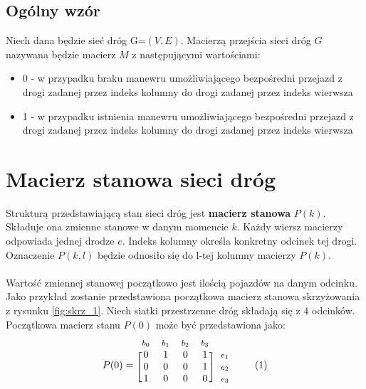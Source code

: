 \documentclass[12pt]{book}
\theoremstyle{plain}
\newcommand\addtag{\refstepcounter{equation}
\renewcommand{\labelenumii}{\theenumii}
\renewcommand{\theenumii}{\theenumi.\arabic{enumii}.}
\tag{\theequation}}
\begin{document}
\subsection{Ogólny wzór}
\begin{tcolorbox}
Niech dana będzie sieć dróg G=$(V,E)$. Macierzą przejścia sieci dróg $G$ nazywana będzie macierz $M$ z następującymi wartościami:
\begin{itemize}
\item 0 - w przypadku braku manewru umożliwiającego bezpośredni przejazd z drogi zadanej przez indeks kolumny do drogi zadanej przez indeks wierwsza
\item 1 - w przypadku istnienia manewru umożliwiającego bezpośredni przejazd z drogi zadanej przez indeks kolumny do drogi zadanej przez indeks wierwsza
\end{itemize}

\end{tcolorbox}





\section{Macierz stanowa sieci dróg}
Strukturą przedstawiającą stan sieci dróg jest \textbf{macierz stanowa} $P(k)$. Składuje ona zmienne stanowe w danym momencie $k$. Każdy wiersz macierzy odpowiada jednej drodze $e$. Indeks kolumny określa konkretny odcinek tej drogi. Oznaczenie $P(k,l)$ będzie odnosiło się do l-tej kolumny macierzy $P(k)$. \\ \\ Wartość zmiennej stanowej początkowo jest ilością pojazdów na danym odcinku.
Jako przykład zostanie przedstawiona początkowa macierz stanowa skrzyżowania z rysunku \ref{fig:skrz_1}. Niech siatki przestrzenne dróg składają się z 4 odcinków. Początkowa macierz stanu $P(0)$ może być przedstawiona jako:
\begin{equation*}
  P(0)=
  \begin{blockarray}{*{4}{c} l}
    \begin{block}{*{4}{>{$\footnotesize}c<{$}} l}
      $b_0$ & $b_1$ & $b_2$ & $b_3$ \\
    \end{block}
    \begin{block}{[*{4}{c}]>{$\footnotesize}l<{$}}
       0 & 1 & 0 & 1 & $e_1$ \\
       0 & 0 & 0 & 1 & $e_2$ \\
       1 & 0 & 0 & 0 & $e_3$ \\
    \end{block}
  \end{blockarray} \addtag \label{skrz_1_P0}
\end{equation*}
\end{document}
